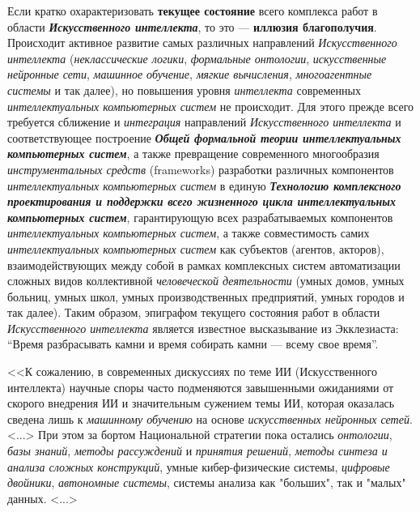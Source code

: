 Если кратко охарактеризовать \textbf{текущее состояние} всего комплекса работ в области \textbf{\textit{Искусственного интеллекта}}, то это --- \textbf{иллюзия благополучия}. Происходит активное  развитие самых различных направлений \textit{Искусственного интеллекта} (\textit{неклассические логики}, \textit{формальные онтологии}, \textit{искусственные нейронные сети}, \textit{машинное обучение}, \textit{мягкие вычисления}, \textit{многоагентные системы} и так далее), но  повышения уровня \textit{интеллекта} современных \textit{интеллектуальных компьютерных систем} не происходит. Для этого прежде всего требуется сближение и \textit{интеграция}  направлений \textit{Искусственного интеллекта} и соответствующее построение \textbf{\textit{Общей формальной теории интеллектуальных компьютерных систем}}, а также превращение современного многообразия \textit{инструментальных средств} (frameworks) разработки различных компонентов \textit{интеллектуальных компьютерных систем} в единую \textbf{\textit{Технологию комплексного проектирования и поддержки всего жизненного цикла интеллектуальных компьютерных систем}}, гарантирующую  всех разрабатываемых компонентов \textit{интеллектуальных компьютерных систем}, а также совместимость самих \textit{интеллектуальных компьютерных систем} как  субъектов (агентов, акторов), взаимодействующих между собой в рамках комплексных систем автоматизации сложных видов коллективной \textit{человеческой деятельности} (умных домов, умных больниц, умных школ, умных производственных предприятий, умных городов и так далее). Таким образом, эпиграфом текущего состояния работ в области \textit{Искусственного интеллекта} является известное высказывание из Экклезиаста: ``Время разбрасывать камни и время собирать камни --- всему свое время''.

<<К сожалению, в современных дискуссиях по теме ИИ (Искусственного интеллекта) научные споры часто подменяются завышенными ожиданиями от скорого внедрения ИИ и значительным сужением темы ИИ, которая оказалась сведена лишь к \textit{машинному обучению} на основе \textit{искусственных нейронных сетей}. <...> При этом за бортом Национальной стратегии пока остались \textit{онтологии}, \textit{базы знаний}, \textit{методы рассуждений} и \textit{принятия решений}, \textit{методы синтеза и} \textit{анализа сложных конструкций}, умные кибер-физические системы, \textit{цифровые двойники}, \textit{автономные системы}, системы анализа как "больших"{}, так и "малых"{} данных. <...>

